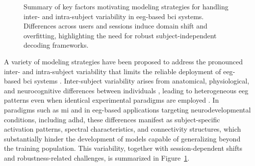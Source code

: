 \begin{figure}[H]
\vspace{-1.2em}
\caption{Summary of key factors motivating modeling strategies for handling inter- and intra-subject variability in \gls{eeg}-based \gls{bci} systems. Differences across users and sessions induce domain shift and overfitting, highlighting the need for robust subject-independent decoding frameworks.}
\label{fig:inter_intra_variability}
\end{figure}

A variety of modeling strategies have been proposed to address the pronounced inter- and intra-subject variability that limits the reliable deployment of \gls{eeg}-based \gls{bci} systems \cite{lotte2018review}. Inter-subject variability arises from anatomical, physiological, and neurocognitive differences between individuals \cite{kim2023bridging}, leading to heterogeneous \gls{eeg} patterns even when identical experimental paradigms are employed \cite{maswanganyi2022statistical}. In paradigms such as \gls{mi} and in \gls{eeg}-based applications targeting neurodevelopmental conditions, including \gls{adhd}, these differences manifest as subject-specific activation patterns, spectral characteristics, and connectivity structures, which substantially hinder the development of models capable of generalizing beyond the training population. {This variability, together with session-dependent shifts and robustness-related challenges, is summarized in Figure~\ref{fig:inter_intra_variability}.}

